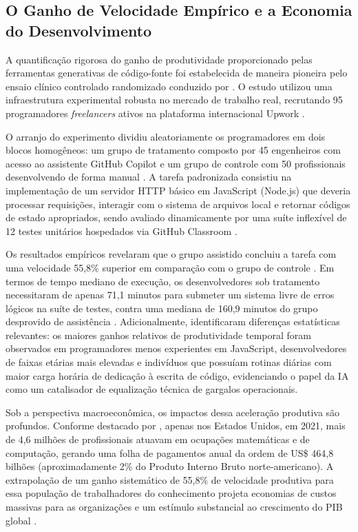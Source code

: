 \subsection{O Ganho de Velocidade Empírico e a Economia do Desenvolvimento}

A quantificação rigorosa do ganho de produtividade proporcionado pelas ferramentas generativas de código-fonte foi estabelecida de maneira pioneira pelo ensaio clínico controlado randomizado conduzido por . O estudo utilizou uma infraestrutura experimental robusta no mercado de trabalho real, recrutando 95 programadores \textit{freelancers} ativos na plataforma internacional Upwork \cite{peng2023}.

O arranjo do experimento dividiu aleatoriamente os programadores em dois blocos homogêneos: um grupo de tratamento composto por 45 engenheiros com acesso ao assistente GitHub Copilot e um grupo de controle com 50 profissionais desenvolvendo de forma manual \cite{peng2023}. A tarefa padronizada consistiu na implementação de um servidor HTTP básico em JavaScript (Node.js) que deveria processar requisições, interagir com o sistema de arquivos local e retornar códigos de estado apropriados, sendo avaliado dinamicamente por uma suíte inflexível de 12 testes unitários hospedados via GitHub Classroom \cite{peng2023}.

Os resultados empíricos revelaram que o grupo assistido concluiu a tarefa com uma velocidade 55,8\% superior em comparação com o grupo de controle \cite{peng2023}. Em termos de tempo mediano de execução, os desenvolvedores sob tratamento necessitaram de apenas 71,1 minutos para submeter um sistema livre de erros lógicos na suíte de testes, contra uma mediana de 160,9 minutos do grupo desprovido de assistência \cite{peng2023}. Adicionalmente,  identificaram diferenças estatísticas relevantes: os maiores ganhos relativos de produtividade temporal foram observados em programadores menos experientes em JavaScript, desenvolvedores de faixas etárias mais elevadas e indivíduos que possuíam rotinas diárias com maior carga horária de dedicação à escrita de código, evidenciando o papel da IA como um catalisador de equalização técnica de gargalos operacionais.

Sob a perspectiva macroeconômica, os impactos dessa aceleração produtiva são profundos. Conforme destacado por , apenas nos Estados Unidos, em 2021, mais de 4,6 milhões de profissionais atuavam em ocupações matemáticas e de computação, gerando uma folha de pagamentos anual da ordem de US\$ 464,8 bilhões (aproximadamente 2\% do Produto Interno Bruto norte-americano). A extrapolação de um ganho sistemático de 55,8\% de velocidade produtiva para essa população de trabalhadores do conhecimento projeta economias de custos massivas para as organizações e um estímulo substancial ao crescimento do PIB global \cite{peng2023}.

